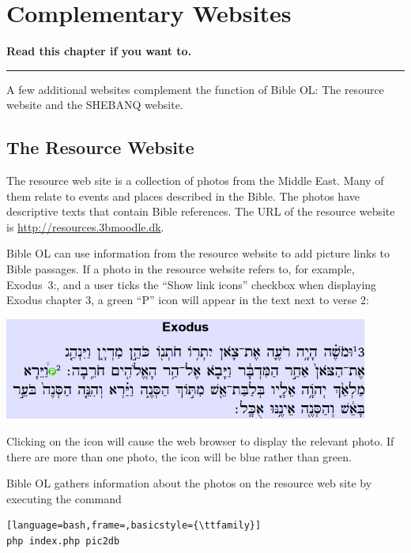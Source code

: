 \documentclass[11pt,oneside,a4paper]{memoir}
\newcommand*{\bibleref}[3]{#1~#2\thinspace:\thinspace#3}
\begin{document}
\chapter{Complementary Websites}

\textbf{Read this chapter if you want to.}
\plainbreak{3}


A few additional websites complement the function of Bible OL: The resource website and the SHEBANQ
website.



\section{The Resource Website}\label{sec-resource-web}

The resource web site is a collection of photos from the Middle East. Many of them relate to events
and places described in the Bible. The photos have descriptive texts that contain Bible references.
The URL of the resource website is \url{http://resources.3bmoodle.dk}.

Bible OL can use information from the resource website to add picture links to Bible passages. If a
photo in the resource website refers to, for example, \bibleref{Exodus}{3}{2}, and a user ticks the
``Show link icons'' checkbox when displaying Exodus chapter 3, a green ``P'' icon will appear in the
text next to verse 2:

\begin{center}
\includegraphics[width=0.9\textwidth]{exodus3.png}
\end{center}

Clicking on the icon will cause the web browser to display the relevant photo. If there are more
than one photo, the icon will be blue rather than green.

Bible OL gathers information about the photos on the resource web site by executing the command

\begin{lstlisting}[language=bash,frame=,basicstyle={\ttfamily}]
php index.php pic2db
\end{lstlisting}
\end{document}
